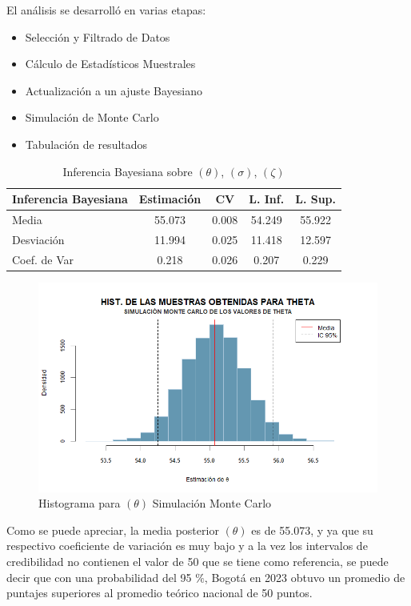 \documentclass[12pt]{article}
\begin{document}
El análisis se desarrolló en varias etapas:

\begin{itemize}
    \item Selección y Filtrado de Datos
    \item Cálculo de Estadísticos Muestrales
    \item Actualización a un ajuste Bayesiano
    \item Simulación de Monte Carlo
     \item Tabulación de resultados
\end{itemize}

\begin{table}[H]
\centering
\begin{tabular}{lcccc}
\hline
\textbf{Inferencia Bayesiana} & \textbf{Estimación} & \textbf{CV} & \textbf{L. Inf.} & \textbf{L. Sup.} \\
\hline
Media & 55.073 & 0.008 & 54.249 & 55.922 \\
Desviación & 11.994 & 0.025 & 11.418 & 12.597 \\
Coef. de Var & 0.218 & 0.026 & 0.207 & 0.229 \\
\hline
\end{tabular}
\caption{Inferencia Bayesiana sobre $(\theta)$, $(\sigma)$, $(\zeta)$ }
\label{tab:inferencia-bayesiana}
\end{table}


\begin{figure}[H]
    \centering
    \includegraphics[width=0.8\linewidth]{Imagenes/Histograma-1.png}
    \caption{Histograma para $(\theta)$ Simulación Monte Carlo }
    \label{fig_enter_label}
\end{figure}

Como se puede apreciar, la media posterior $(\theta)$ es de 55.073, y ya que su respectivo coeficiente de variación es muy bajo y a la vez los intervalos de credibilidad no contienen el valor de 50 que se tiene como referencia, se puede decir que con una probabilidad del 95 $\%$, Bogotá en 2023 obtuvo un promedio de puntajes superiores al promedio teórico nacional de 50 puntos. 
\end{document}
